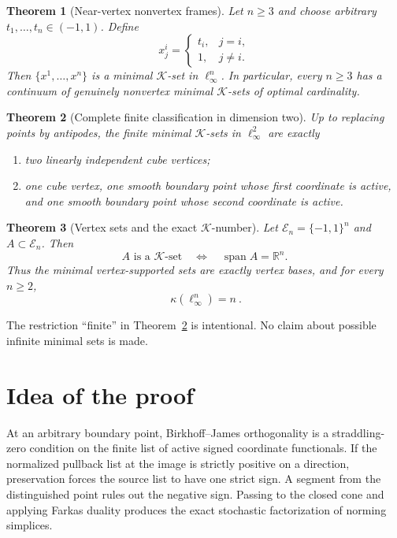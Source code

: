 \documentclass[11pt]{article}
\newtheorem{theorem}{Theorem}
\theoremstyle{definition}
\theoremstyle{remark}
\newcommand{\R}{\mathbb R}
\newcommand{\E}{\mathcal E_n}
\newcommand{\K}{\mathcal K}
\newcommand{\Span}{\operatorname{span}}
\begin{document}
\begin{theorem}[Near-vertex nonvertex frames]\label{thm:near}
Let $n\geq3$ and choose arbitrary $t_1,\ldots,t_n\in(-1,1)$.  Define
\[
 x^i_j=\begin{cases}t_i,&j=i,\\1,&j\neq i.\end{cases}
\]
Then $\{x^1,\ldots,x^n\}$ is a minimal $\K$-set in $\ell_\infty^n$.
In particular, every $n\geq3$ has a continuum of genuinely nonvertex
minimal $\K$-sets of optimal cardinality.
\end{theorem}

\begin{theorem}[Complete finite classification in dimension two]
\label{thm:two}
Up to replacing points by antipodes, the finite minimal $\K$-sets in
$\ell_\infty^2$ are exactly
\begin{enumerate}[label=\textup{(\roman*)}]
\item two linearly independent cube vertices;
\item one cube vertex, one smooth boundary point whose first coordinate is
active, and one smooth boundary point whose second coordinate is active.
\end{enumerate}
\end{theorem}

\begin{theorem}[Vertex sets and the exact $\K$-number]\label{thm:vertex}
Let $\E=\{-1,1\}^n$ and $A\subset\E$.  Then
\[
 A\text{ is a }\K\text{-set}\quad\Longleftrightarrow\quad
 \Span A=\R^n.
\]
Thus the minimal vertex-supported sets are exactly vertex bases, and for
every $n\geq2$,
\[
 \boxed{\ \kappa(\ell_\infty^n)=n\ }.
\]
\end{theorem}

The restriction ``finite'' in Theorem~\ref{thm:two} is intentional.  No
claim about possible infinite minimal sets is made.

\section{Idea of the proof}

At an arbitrary boundary point, Birkhoff--James orthogonality is a
straddling-zero condition on the finite list of active signed coordinate
functionals.  If the normalized pullback list at the image is strictly
positive on a direction, preservation forces the source list to have one
strict sign.  A segment from the distinguished point rules out the negative
sign.  Passing to the closed cone and applying Farkas duality produces the
exact stochastic factorization of norming simplices.
\end{document}
